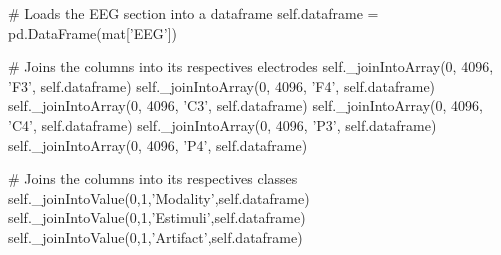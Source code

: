 # Loads the EEG section into a dataframe
self.dataframe = pd.DataFrame(mat['EEG'])

# Joins the columns into its respectives electrodes
self._joinIntoArray(0, 4096, 'F3', self.dataframe)
self._joinIntoArray(0, 4096, 'F4', self.dataframe)
self._joinIntoArray(0, 4096, 'C3', self.dataframe)
self._joinIntoArray(0, 4096, 'C4', self.dataframe)
self._joinIntoArray(0, 4096, 'P3', self.dataframe)
self._joinIntoArray(0, 4096, 'P4', self.dataframe)

# Joins the columns into its respectives classes
self._joinIntoValue(0,1,'Modality',self.dataframe)
self._joinIntoValue(0,1,'Estimuli',self.dataframe)
self._joinIntoValue(0,1,'Artifact',self.dataframe)